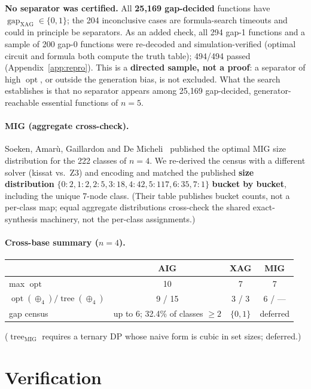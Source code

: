\documentclass[11pt]{article}
\DeclareMathOperator{\opt}{opt}
\DeclareMathOperator{\tree}{tree}
\DeclareMathOperator{\gapop}{gap}
\newcommand{\gapx}{\gapop_{\mathrm{XAG}}}
\newcommand{\treemig}{\tree_{\mathrm{MIG}}}
\theoremstyle{plain}
\begin{document}
\noindent
\textbf{No separator was certified.} All \textbf{25{,}169 gap-decided} functions have
$\gapx \in \{0,1\}$; the 204 inconclusive cases are formula-search timeouts and could in principle
be separators. As an added check, all 294 gap-1 functions and a sample of 200 gap-0 functions were
re-decoded and simulation-verified (optimal circuit and formula both compute the truth table);
494/494 passed (Appendix~\ref{app:repro}). This is a \textbf{directed sample, not a proof}: a
separator of high $\opt$, or outside the generation bias, is not excluded. What the search
establishes is that no separator appears among 25{,}169 gap-decided, generator-reachable essential
functions of $n = 5$.

\paragraph{MIG (aggregate cross-check).} Soeken, Amarù, Gaillardon and De Micheli~\cite{soeken2016}
published the optimal MIG size distribution for the 222 classes of $n = 4$. We re-derived the census
with a different solver (kissat vs.\ Z3) and encoding and matched the published \textbf{size
distribution} $\{0{:}2, 1{:}2, 2{:}5, 3{:}18, 4{:}42, 5{:}117, 6{:}35, 7{:}1\}$ \textbf{bucket by
bucket}, including the unique 7-node class. (Their table publishes bucket counts, not a per-class
map; equal aggregate distributions cross-check the shared exact-synthesis machinery, not the
per-class assignments.)

\paragraph{Cross-base summary ($n = 4$).}

\begin{table}[h]
\centering
\begin{tabular}{lccc}
\toprule
 & AIG & XAG & MIG \\
\midrule
max $\opt$ & 10 & 7 & 7 \\
$\opt(\oplus_4) / \tree(\oplus_4)$ & 9 / 15 & 3 / 3 & 6 / --- \\
gap census & up to 6; 32.4\% of classes $\ge 2$ & $\{0,1\}$ & deferred \\
\bottomrule
\end{tabular}
\end{table}

\noindent
($\treemig$ requires a ternary DP whose naive form is cubic in set sizes; deferred.)

\section{Verification}
\label{sec:verification}
\end{document}
